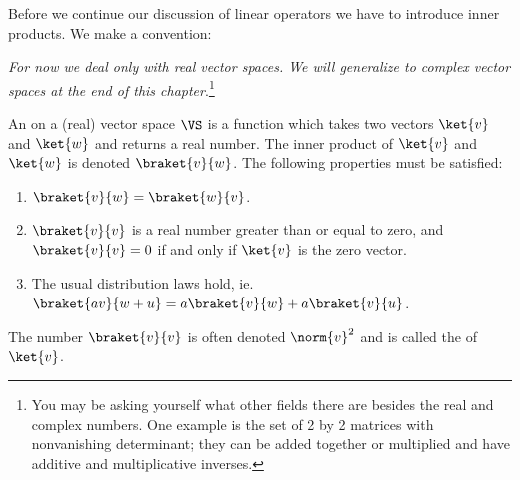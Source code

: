 Before we continue our discussion of linear operators we have to introduce inner products.  We make a convention:

\textit{For now we deal only with real vector spaces.  We will generalize to complex vector spaces at the end of this chapter}.\footnote{You may be asking yourself what other fields there are besides the real and complex numbers.  One example is the set of 2 by 2 matrices with nonvanishing determinant; they can be added together or multiplied and have additive and multiplicative inverses.}

\begin{definition}
  An  on a (real) vector space $\VS$ is a function which takes two vectors $\ket{v}$ and $\ket{w}$ and returns a real number.
  The inner product of $\ket{v}$ and $\ket{w}$ is denoted $\braket{v}{w}$.
  The following properties must be satisfied:
  \begin{enumerate}
    \item[1.] $\braket{v}{w} = \braket{w}{v}$.
    \item[2.] $\braket{v}{v}$ is a real number greater than or equal to zero, and $\braket{v}{v} = 0$ if and only if $\ket{v}$ is the zero vector.
    \item[3.] The usual distribution laws hold, ie. $\braket{av}{w + u} = a\braket{v}{w} + a\braket{v}{u}$.
  \end{enumerate}
\end{definition}
The number $\braket{v}{v}$ is often denoted $\norm{v}^2$ and is called the  of $\ket{v}$.

